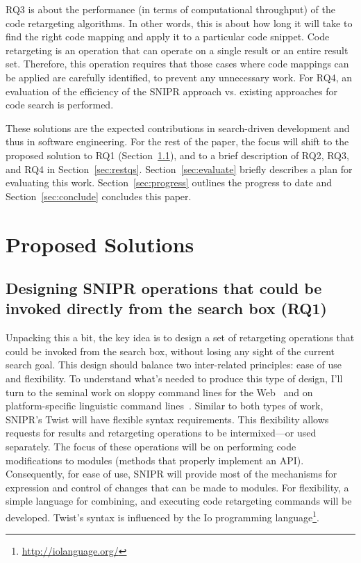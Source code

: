 \documentclass[conference]{IEEEtran}
\begin{document}
RQ3 is about the performance (in terms of computational throughput) of the code retargeting algorithms. In other words, this is about how long it will take to find the right code mapping and apply it to a particular code snippet. Code retargeting is an operation that can operate on a single result or an entire result set. Therefore, this operation requires that those cases where code mappings can be applied are carefully identified, to prevent any unnecessary work. For RQ4, an evaluation of the efficiency of the \uppercase{SnipR} approach vs. existing approaches for code search is performed. 

These solutions are the expected contributions in search-driven development and thus in software engineering. For the rest of the paper, the focus will shift to the proposed solution to RQ1 (Section~\ref{sec:rq1}), and to a brief description of RQ2, RQ3, and RQ4 in Section~\ref{sec:restqs}. Section~\ref{sec:evaluate} briefly describes a plan for evaluating this work. Section~\ref{sec:progress} outlines the progress to date and Section~\ref{sec:conclude} concludes this paper. 

\section{Proposed Solutions}
\subsection{Designing \uppercase{SnipR} operations that could be invoked directly from the search box (RQ1)}
\label{sec:rq1}
Unpacking this a bit, the key idea is to design a set of retargeting operations that could be invoked from the search box, without losing any sight of the current search goal. This design should balance two inter-related principles: ease of use and flexibility. To understand what's needed to produce this type of design, I'll turn to the seminal work on sloppy command lines for the Web~\cite{Little:2007dh, Miller:2008ge} and on platform-specific linguistic command lines~\cite{Raskin:2008wb}. Similar to both types of work, \uppercase{SnipR}'s Twist will have flexible syntax requirements. This flexibility allows requests for results and retargeting operations to be intermixed---or used separately. The focus of these operations will be on performing code modifications to modules (methods that properly implement an API). Consequently, for ease of use, \uppercase{SnipR} will provide most of the mechanisms for expression and control of changes that can be made to modules. For flexibility, a simple language for combining, and executing code retargeting commands will be developed. Twist's syntax is influenced by the Io programming language\footnote{\url{http://iolanguage.org/}}.
\end{document}
